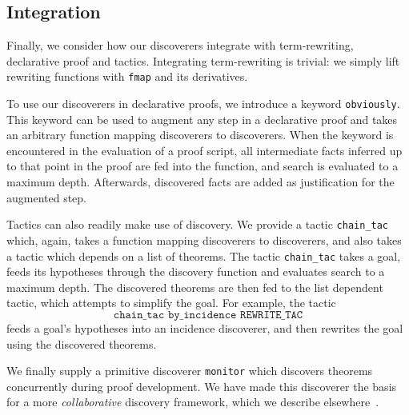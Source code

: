 \subsection{Integration}
Finally, we consider how our discoverers integrate with term-rewriting, declarative proof and tactics. Integrating term-rewriting is trivial: we simply lift rewriting functions with \texttt{fmap} and its derivatives. 

To use our discoverers in declarative proofs, we introduce a keyword \linebreak\texttt{obviously}. This keyword can be used to augment any step in a declarative proof and takes an arbitrary function mapping discoverers to discoverers. When the keyword is encountered in the evaluation of a proof script, all intermediate facts inferred up to that point in the proof are fed into the function, and search is evaluated to a maximum depth. Afterwards, discovered facts are added as justification for the augmented step.

Tactics can also readily make use of discovery. We provide a tactic \texttt{chain\_tac} which, again, takes a function mapping discoverers to discoverers, and also takes a tactic which depends on a list of theorems. The tactic \texttt{chain\_tac} takes a goal, feeds its hypotheses through the discovery function and evaluates search to a maximum depth. The discovered theorems are then fed to the list dependent tactic, which attempts to simplify the goal. For example, the tactic 
\begin{displaymath}
\texttt{chain\_tac by\_incidence REWRITE\_TAC} 
\end{displaymath}
feeds a goal's hypotheses into an incidence discoverer, and then rewrites the goal using the discovered theorems.

We finally supply a primitive discoverer \texttt{monitor} which discovers theorems concurrently during proof development. We have made this discoverer the basis for a more \emph{collaborative} discovery framework, which we describe elsewhere~\cite{ScottComposable}.


